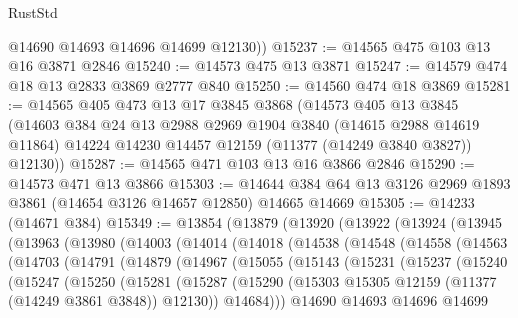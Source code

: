 \begin{lexlean}{RustStd}
\begin{coremodule}
{\begin{coremodule}
{{{{{{{{{{{{{{{{{{{{{{{{{{{{{{{{{        @14690
        @14693
        @14696
        @14699
        @12130))
@15237 := @14565 @475 @103 @13 @16 @3871 @2846
@15240 := @14573 @475 @13 @3871
@15247 := @14579 @474 @18 @13 @2833 @3869 @2777 @840
@15250 := @14560 @474 @18 @3869
@15281 := @14565
    @405
    @473
    @13
    @17
    @3845
    @3868
    (@14573
      @405
      @13
      @3845
      (@14603
        @384
        @24
        @13
        @2988
        @2969
        @1904
        @3840
        (@14615 @2988 @14619 @11864)
        @14224
        @14230
        @14457
        @12159
        (@11377 (@14249 @3840 @3827))
        @12130))
@15287 := @14565 @471 @103 @13 @16 @3866 @2846
@15290 := @14573 @471 @13 @3866
@15303 := @14644 @384 @64 @13 @3126 @2969 @1893 @3861 (@14654 @3126 @14657 @12850) @14665 @14669
@15305 := @14233 (@14671 @384)
@15349 := @13854
    (@13879
      (@13920
        (@13922
          (@13924
            (@13945
              (@13963
                (@13980
                  (@14003
                    (@14014
                      (@14018
                        (@14538
                          (@14548
                            (@14558
                              (@14563
                                (@14703
                                  (@14791
                                    (@14879
                                      (@14967
                                        (@15055
                                          (@15143
                                            (@15231
                                              (@15237
                                                (@15240
                                                  (@15247
                                                    (@15250
                                                      (@15281
                                                        (@15287
                                                          (@15290
                                                            (@15303
                                                              @15305
                                                              @12159
                                                              (@11377 (@14249 @3861 @3848))
                                                              @12130))
                                                          @14684)))
                                                    @14690
                                                    @14693
                                                    @14696
                                                    @14699
}}}}}}}}}}}}}}}}}}}}}}}}}}}}}}}}}
\end{coremodule}}
\end{coremodule}
\end{lexlean}
